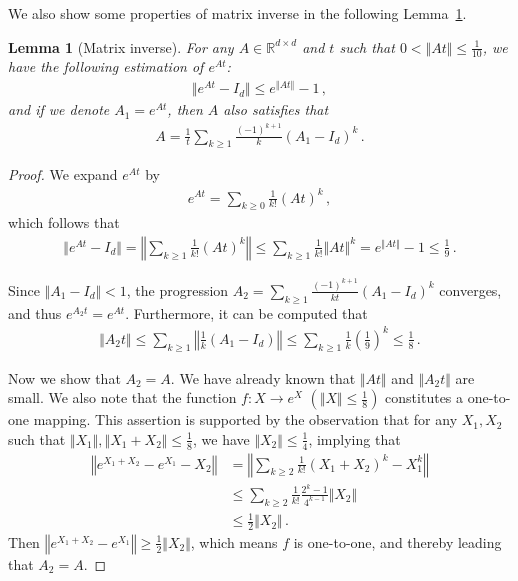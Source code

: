 \documentclass{article}
\newtheorem{lemma}[theorem]{Lemma}
\theoremstyle{definition}
\begin{document}
We also show some properties of matrix inverse in the following Lemma~\ref{lem:matrix inverse}.

\begin{lemma}[Matrix inverse]\label{lem:matrix inverse}
For any $A\in\mathbb{R}^{d\times d}$ and $t$ such that $0<\Vert At\Vert \leq \frac{1}{10}$, we have the following estimation of $e^{At}$:
\begin{align*}
    \Vert e^{At}-I_{d}\Vert \leq e^{\Vert At\Vert }-1\,,
\end{align*}
and if we denote $A_{1}=e^{At}$, then $A$ also satisfies that 
\begin{align*}
A=\frac{1}{t}\sum_{k\geq 1}\frac{(-1)^{k+1}}{k}(A_{1}-I_{d})^{k}\,.
\end{align*}

\end{lemma}
\begin{proof}
We expand $e^{At}$ by
\begin{align*}
    e^{At}=\sum_{k\geq 0}\frac{1}{k!}(At)^{k}\,,
\end{align*}
which follows that
\begin{align*}
    \Vert e^{At}-I_{d}\Vert =\left\Vert\sum_{k\geq 1}\frac{1}{k!}(At)^{k}\right\Vert\leq \sum_{k\geq 1}\frac{1}{k!}\Vert At\Vert ^{k}= e^{\Vert At\Vert }-1\leq \frac{1}{9}\,.
\end{align*}

Since $\Vert A_{1}-I_{d}\Vert <1$, the progression $A_{2}=\sum_{k\geq 1}\frac{(-1)^{k+1}}{kt}(A_{1}-I_{d})^{k}$ converges, and thus 
$e^{A_{2}t}=e^{At}$. Furthermore, it can be computed that
\begin{align*}
\Vert A_{2}t\Vert \leq \sum_{k\geq 1}\left\Vert \frac{1}{k}(A_{1}-I_{d})\right\Vert\leq \sum_{k\geq 1}\frac{1}{k}(\frac{1}{9})^{k}\leq \frac{1}{8}\,.
\end{align*}

Now we show that $A_{2}=A$. We have already known that $\Vert At\Vert $ and $\Vert A_{2}t\Vert $ are small. We also note that the function $f:X\to e^{X}$ $\left( \Vert X\Vert \leq \frac{1}{8}\right)$ constitutes a one-to-one mapping. This assertion is supported by the observation that for any  $X_{1},X_{2}$ such that $\Vert X_{1}\Vert ,\Vert X_{1}+X_{2}\Vert \leq\frac{1}{8}$, we have $\Vert X_{2}\Vert \leq \frac{1}{4}$, implying that 
\begin{align}\label{error of exponential}
\left\Vert e^{X_{1}+X_{2}}-e^{X_{1}}-X_{2}\right\Vert&=\left\Vert\sum_{k\geq 2}\frac{1}{k!}(X_{1}+X_{2})^{k}-X_{1}^{k}\right\Vert\\
&\leq\sum_{k\geq 2}\frac{1}{k!}\frac{2^{k}-1}{4^{k-1}}\Vert X_{2}\Vert \\
&\leq \frac{1}{2}\Vert X_{2}\Vert \,.
\end{align}
Then $\left\Vert e^{X_{1}+X_{2}}-e^{X_{1}}\right\Vert \geq \frac{1}{2}\Vert X_{2}\Vert $, which means $f$ is one-to-one, and thereby leading that $A_{2}=A$.

\end{proof}
\end{document}
